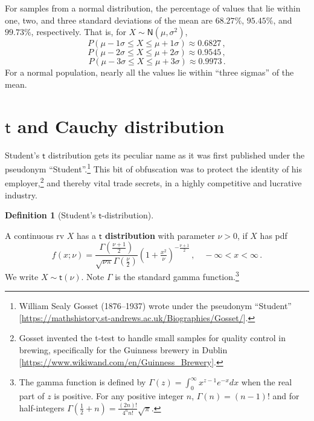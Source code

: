 \documentclass[
  a4paper,
  oneside]{book}
\theoremstyle{definition}
\newtheorem{definition}{Definition}[chapter]
\theoremstyle{definition}
\theoremstyle{definition}
\theoremstyle{plain}
\theoremstyle{remark}
\begin{document}
For samples from a normal distribution, the percentage of values that
lie within one, two, and three standard deviations of the mean are
\(68.27\%\), \(95.45\%\), and \(99.73\%\), respectively. That is, for
\(X \sim \mathsf{N}(\mu, \sigma^2)\), \[
P(\mu - 1 \sigma \leq X \leq \mu + 1 \sigma ) \approx 0.6827\,,
\] \[
P(\mu - 2 \sigma \leq X \leq \mu + 2 \sigma ) \approx 0.9545\,,
\] \[
P(\mu - 3 \sigma \leq X \leq \mu + 3 \sigma ) \approx 0.9973\,.
\] For a normal population, nearly all the values lie within ``three
sigmas'' of the mean.

\section{\texorpdfstring{\(\mathsf{t}\) and Cauchy
distribution}{\textbackslash mathsf\{t\} and Cauchy distribution}}\label{t-distribution}

Student's \(\mathsf{t}\) distribution gets its peculiar name as it was
first published under the pseudonym ``Student''.\footnote{William Sealy
  Gosset (1876--1937) wrote under the pseudonym ``Student''
  {[}\url{https://mathshistory.st-andrews.ac.uk/Biographies/Gosset/}{]}.}
This bit of obfuscation was to protect the identity of his
employer,\footnote{Gosset invented the t-test to handle small samples
  for quality control in brewing, specifically for the Guinness brewery
  in Dublin {[}\url{https://www.wikiwand.com/en/Guinness_Brewery}{]}.}
and thereby vital trade secrets, in a highly competitive and lucrative
industry.

\begin{definition}[Student's
\(\mathsf{t}\)-distribution]\protect\hypertarget{def-t-dist}{}\label{def-t-dist}

A continuous rv \(X\) has a \textbf{\(\mathsf{t}\) distribution} with
parameter \(\nu > 0\), if \(X\) has pdf \begin{equation*}
f(x; \nu) = \frac{\Gamma\left(\tfrac{\nu+1}{2}\right)}{\sqrt{\nu \pi} \Gamma \left(\tfrac{\nu}{2}\right)} \left( 1 + \tfrac{x^2}{\nu} \right)^{- \frac{\nu+1}{2}} \,, \quad -\infty < x < \infty\,.
\end{equation*} We write \(X \sim \mathsf{t}(\nu)\). Note \(\Gamma\) is
the standard gamma function.\footnote{The gamma function is defined by
  \(\Gamma(z) = \int_0^\infty x^{z-1}e^{-x} dx\) when the real part of
  \(z\) is positive. For any positive integer \(n\),
  \(\Gamma(n) = (n-1)!\) and for half-integers
  \(\Gamma(\tfrac{1}{2} + n) = \frac{(2n)!}{4^n n!} \sqrt{\pi}\).}

\end{definition}
\end{document}
